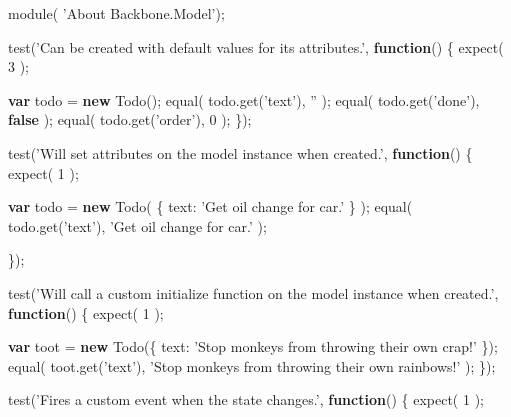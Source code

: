 \documentclass[9pt]{book}
\newenvironment{Shaded}{}{}
\newcommand{\KeywordTok}[1]{\textcolor[rgb]{0.00,0.44,0.13}{\textbf{{#1}}}}
\newcommand{\DataTypeTok}[1]{\textcolor[rgb]{0.56,0.13,0.00}{{#1}}}
\newcommand{\DecValTok}[1]{\textcolor[rgb]{0.25,0.63,0.44}{{#1}}}
\newcommand{\StringTok}[1]{\textcolor[rgb]{0.25,0.44,0.63}{{#1}}}
\newcommand{\OtherTok}[1]{\textcolor[rgb]{0.00,0.44,0.13}{{#1}}}
\newcommand{\FunctionTok}[1]{\textcolor[rgb]{0.02,0.16,0.49}{{#1}}}
\newcommand{\NormalTok}[1]{{#1}}
\begin{document}
\begin{Shaded}
\begin{Highlighting}[]
\FunctionTok{module}\NormalTok{( }\StringTok{'About Backbone.Model'}\NormalTok{);}

\FunctionTok{test}\NormalTok{(}\StringTok{'Can be created with default values for its attributes.'}\NormalTok{, }\KeywordTok{function}\NormalTok{() \{}
    \FunctionTok{expect}\NormalTok{( }\DecValTok{3} \NormalTok{);}

    \KeywordTok{var} \NormalTok{todo = }\KeywordTok{new} \FunctionTok{Todo}\NormalTok{();}
    \FunctionTok{equal}\NormalTok{( }\OtherTok{todo}\NormalTok{.}\FunctionTok{get}\NormalTok{(}\StringTok{'text'}\NormalTok{), }\StringTok{''} \NormalTok{);}
    \FunctionTok{equal}\NormalTok{( }\OtherTok{todo}\NormalTok{.}\FunctionTok{get}\NormalTok{(}\StringTok{'done'}\NormalTok{), }\KeywordTok{false} \NormalTok{);}
    \FunctionTok{equal}\NormalTok{( }\OtherTok{todo}\NormalTok{.}\FunctionTok{get}\NormalTok{(}\StringTok{'order'}\NormalTok{), }\DecValTok{0} \NormalTok{);}
\NormalTok{\});}

\FunctionTok{test}\NormalTok{(}\StringTok{'Will set attributes on the model instance when created.'}\NormalTok{, }\KeywordTok{function}\NormalTok{() \{}
    \FunctionTok{expect}\NormalTok{( }\DecValTok{1} \NormalTok{);}

    \KeywordTok{var} \NormalTok{todo = }\KeywordTok{new} \FunctionTok{Todo}\NormalTok{( \{ }\DataTypeTok{text}\NormalTok{: }\StringTok{'Get oil change for car.'} \NormalTok{\} );}
    \FunctionTok{equal}\NormalTok{( }\OtherTok{todo}\NormalTok{.}\FunctionTok{get}\NormalTok{(}\StringTok{'text'}\NormalTok{), }\StringTok{'Get oil change for car.'} \NormalTok{);}

\NormalTok{\});}

\FunctionTok{test}\NormalTok{(}\StringTok{'Will call a custom initialize function on the model instance when created.'}\NormalTok{, }\KeywordTok{function}\NormalTok{() \{}
    \FunctionTok{expect}\NormalTok{( }\DecValTok{1} \NormalTok{);}

    \KeywordTok{var} \NormalTok{toot = }\KeywordTok{new} \FunctionTok{Todo}\NormalTok{(\{ }\DataTypeTok{text}\NormalTok{: }\StringTok{'Stop monkeys from throwing their own crap!'} \NormalTok{\});}
    \FunctionTok{equal}\NormalTok{( }\OtherTok{toot}\NormalTok{.}\FunctionTok{get}\NormalTok{(}\StringTok{'text'}\NormalTok{), }\StringTok{'Stop monkeys from throwing their own rainbows!'} \NormalTok{);}
\NormalTok{\});}

\FunctionTok{test}\NormalTok{(}\StringTok{'Fires a custom event when the state changes.'}\NormalTok{, }\KeywordTok{function}\NormalTok{() \{}
    \FunctionTok{expect}\NormalTok{( }\DecValTok{1} \NormalTok{);}


\end{Highlighting}
\end{Shaded}
\end{document}
